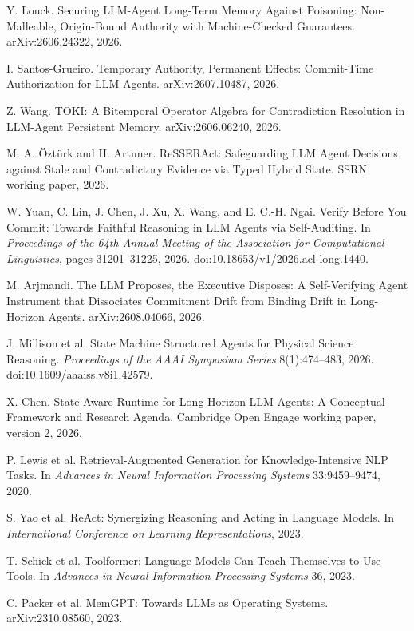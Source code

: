  Y. Louck. Securing LLM-Agent Long-Term Memory Against Poisoning: Non-Malleable, Origin-Bound Authority with Machine-Checked Guarantees. arXiv:2606.24322, 2026.

 I. Santos-Grueiro. Temporary Authority, Permanent Effects: Commit-Time Authorization for LLM Agents. arXiv:2607.10487, 2026.

 Z. Wang. TOKI: A Bitemporal Operator Algebra for Contradiction Resolution in LLM-Agent Persistent Memory. arXiv:2606.06240, 2026.

 M. A. \"Ozt\"urk and H. Artuner. ReSSERAct: Safeguarding LLM Agent Decisions against Stale and Contradictory Evidence via Typed Hybrid State. SSRN working paper, 2026.

 W. Yuan, C. Lin, J. Chen, J. Xu, X. Wang, and E. C.-H. Ngai. Verify Before You Commit: Towards Faithful Reasoning in LLM Agents via Self-Auditing. In \emph{Proceedings of the 64th Annual Meeting of the Association for Computational Linguistics}, pages 31201--31225, 2026. doi:10.18653/v1/2026.acl-long.1440.

 M. Arjmandi. The LLM Proposes, the Executive Disposes: A Self-Verifying Agent Instrument that Dissociates Commitment Drift from Binding Drift in Long-Horizon Agents. arXiv:2608.04066, 2026.

 J. Millison et al. State Machine Structured Agents for Physical Science Reasoning. \emph{Proceedings of the AAAI Symposium Series} 8(1):474--483, 2026. doi:10.1609/aaaiss.v8i1.42579.

 X. Chen. State-Aware Runtime for Long-Horizon LLM Agents: A Conceptual Framework and Research Agenda. Cambridge Open Engage working paper, version 2, 2026.

 P. Lewis et al. Retrieval-Augmented Generation for Knowledge-Intensive NLP Tasks. In \emph{Advances in Neural Information Processing Systems} 33:9459--9474, 2020.

 S. Yao et al. ReAct: Synergizing Reasoning and Acting in Language Models. In \emph{International Conference on Learning Representations}, 2023.

 T. Schick et al. Toolformer: Language Models Can Teach Themselves to Use Tools. In \emph{Advances in Neural Information Processing Systems} 36, 2023.

 C. Packer et al. MemGPT: Towards LLMs as Operating Systems. arXiv:2310.08560, 2023.

